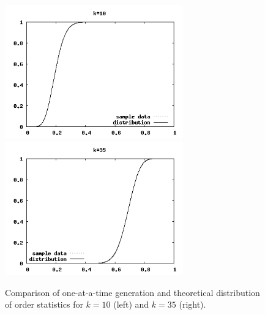 \documentclass[12pt]{article} %
\begin{document}
\begin{figure}[ht]
\vspace{-3mm}
\centering
\includegraphics[width=7.7cm]{compOneDistrib10}
\includegraphics[width=7.7cm]{compOneDistrib35}
\vspace{-4mm}
\caption{Comparison of one-at-a-time generation and theoretical distribution of order statistics for $k=10$ (left) and $k=35$ (right).}
\label{fig:compOneDistrib}
\vspace{-4mm}
\end{figure}
%
%
%


%
\end{document}
